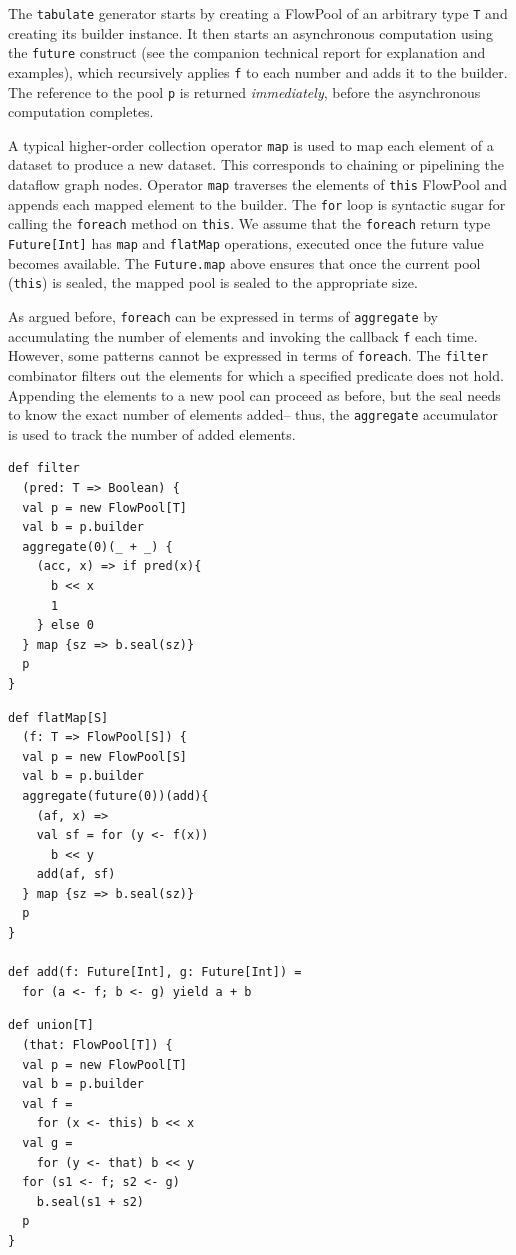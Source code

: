 The \verb=tabulate= generator starts by creating a FlowPool of an
arbitrary type \verb=T= and creating its builder instance.
It then starts an asynchronous computation using the \verb=future=
construct (see the companion technical report \cite{Prokopec12}
for explanation and examples), which recursively applies \verb=f= to each number and
adds it to the builder.
The reference to the pool \verb=p= is returned \emph{immediately},
before the asynchronous computation completes.

A typical higher-order collection operator \verb=map= is used to
map each element of a dataset to produce a new dataset.
This corresponds to chaining or pipelining the dataflow graph nodes.
Operator \verb=map= traverses the elements of \verb=this= FlowPool
and appends each mapped element to the builder.
The \verb=for= loop is syntactic sugar for calling the
\verb=foreach= method on \verb=this=.
We assume that the \verb=foreach= return type \verb=Future[Int]=
has \verb=map= and \verb=flatMap= operations, executed
once the future value becomes available.
The \verb=Future.map= above ensures that once the current pool (\verb=this=) is
sealed, the mapped pool is sealed to the appropriate size.

As argued before, \verb=foreach= can be expressed in terms of
\verb=aggregate= by accumulating the number of elements and invoking the
callback \verb=f= each time.
However, some patterns cannot be expressed in terms of \verb=foreach=.
The \verb=filter= combinator filters out the elements for which a
specified predicate does not hold.
Appending the elements to a new pool can proceed as
before, but the seal needs to know the exact number of elements added--
thus, the \verb=aggregate= accumulator is used to track the number
of added elements.

\noindent
\begin{minipage}[t]{5.2 cm}
\begin{verbatim}
def filter
  (pred: T => Boolean) {
  val p = new FlowPool[T]
  val b = p.builder
  aggregate(0)(_ + _) {
    (acc, x) => if pred(x){
      b << x
      1
    } else 0
  } map {sz => b.seal(sz)}
  p
}
\end{verbatim}
\end{minipage}\begin{minipage}[t]{5.3 cm}
\begin{verbatim}
def flatMap[S]
  (f: T => FlowPool[S]) {
  val p = new FlowPool[S]
  val b = p.builder
  aggregate(future(0))(add){
    (af, x) =>
    val sf = for (y <- f(x))
      b << y
    add(af, sf)
  } map {sz => b.seal(sz)}
  p
}

def add(f: Future[Int], g: Future[Int]) =
  for (a <- f; b <- g) yield a + b
\end{verbatim}
\end{minipage}
\begin{minipage}[t]{4 cm}
\begin{verbatim}
def union[T]
  (that: FlowPool[T]) {
  val p = new FlowPool[T]
  val b = p.builder
  val f =
    for (x <- this) b << x
  val g =
    for (y <- that) b << y
  for (s1 <- f; s2 <- g)
    b.seal(s1 + s2)
  p
}
\end{verbatim}
\end{minipage}

